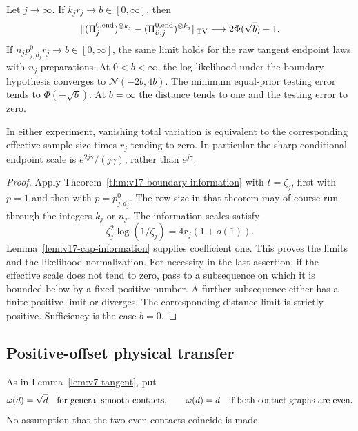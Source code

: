 \begin{theorem}
\label{thm:v17-endpoint-tangent}
Let $j\to\infty$. If $k_j r_j\to b\in[0,\infty]$, then
\begin{equation}\label{eq:v17-endpoint-conditional}
 \| (\Pi^{0,\rm end}_j)^{\otimes k_j}
       -(\Pi^{0,\rm end}_{\partial,j})^{\otimes k_j}\|_{\rm TV}
                         \longrightarrow 2\Phi(\sqrt b)-1.
\end{equation}
If $n_jp_{j,d_j}^0r_j\to b\in[0,\infty]$, the same limit holds
for the raw tangent endpoint laws with $n_j$ preparations. At
$0<b<\infty$, the log likelihood under the boundary hypothesis
converges to $\mathcal N(-2b,4b)$. The minimum equal-prior testing
error tends to $\Phi(-\sqrt b)$. At $b=\infty$ the distance tends
to one and the testing error to zero.

In either experiment, vanishing total variation is equivalent to the
corresponding effective sample size times $r_j$ tending to zero.
In particular the sharp conditional endpoint scale is
$e^{2j\gamma}/(j\gamma)$, rather than $e^{j\gamma}$.
\end{theorem}
\begin{proof}
Apply Theorem~\ref{thm:v17-boundary-information} with
$t=\zeta_j$, first with $p=1$ and then with $p=p_{j,d_j}^0$.
The row size in that theorem may of course run through the integers
$k_j$ or $n_j$. The information scales satisfy
\[
            \zeta_j^2\log(1/\zeta_j)=4r_j(1+o(1)).
\]
Lemma~\ref{lem:v17-cap-information} supplies coefficient one.
This proves the limits and the likelihood normalization. For necessity
in the last assertion, if the effective scale does not tend to zero,
pass to a subsequence on which it is bounded below by a fixed positive
number. A further subsequence either has a finite positive limit or
diverges. The corresponding distance limit is strictly positive.
Sufficiency is the case $b=0$.
\end{proof}

\subsection{Positive-offset physical transfer}
As in Lemma~\ref{lem:v7-tangent}, put
\[
 \omega(d)=\sqrt d\quad\hbox{for general smooth contacts},\qquad
 \omega(d)=d\quad\hbox{if both contact graphs are even}.
\]
No assumption that the two even contacts coincide is made.

